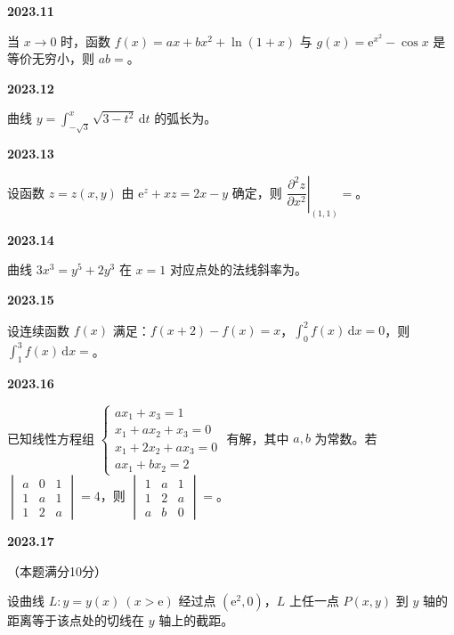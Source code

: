 \documentclass[UTF8,12pt,fontset=windows]{ctexart}
\begin{document}
\vfill
\newpage
{\large\bfseries 2023.11}

当 $x \to 0$ 时，函数 $f(x) = ax + bx^2 + \ln(1+x)$ 与 $g(x) = \mathrm{e}^{x^2} - \cos x$ 是等价无穷小，则 $ab =$\underline{\hspace{20mm}}。

\vfill
\newpage
{\large\bfseries 2023.12}

曲线 $y = \int_{-\sqrt{3}}^{x}\sqrt{3-t^2}\,\mathrm{d}t$ 的弧长为\underline{\hspace{20mm}}。

\vfill
\newpage
{\large\bfseries 2023.13}

设函数 $z = z(x,y)$ 由 $\mathrm{e}^z + xz = 2x - y$ 确定，则 $\left.\dfrac{\partial^2 z}{\partial x^2}\right|_{(1,1)} =$\underline{\hspace{20mm}}。

\vfill
\newpage
{\large\bfseries 2023.14}

曲线 $3x^3 = y^5 + 2y^3$ 在 $x = 1$ 对应点处的法线斜率为\underline{\hspace{20mm}}。

\vfill
\newpage
{\large\bfseries 2023.15}

设连续函数 $f(x)$ 满足：$f(x+2) - f(x) = x$，$\int_{0}^{2}f(x)\,\mathrm{d}x = 0$，则 $\int_{1}^{3}f(x)\,\mathrm{d}x =$\underline{\hspace{20mm}}。

\vfill
\newpage
{\large\bfseries 2023.16}

已知线性方程组 $\begin{cases} ax_1 + x_3 = 1 \\ x_1 + ax_2 + x_3 = 0 \\ x_1 + 2x_2 + ax_3 = 0 \\ ax_1 + bx_2 = 2 \end{cases}$ 有解，其中 $a, b$ 为常数。若 $\begin{vmatrix} a & 0 & 1 \\ 1 & a & 1 \\ 1 & 2 & a \end{vmatrix} = 4$，则 $\begin{vmatrix} 1 & a & 1 \\ 1 & 2 & a \\ a & b & 0 \end{vmatrix} =$\underline{\hspace{20mm}}。

\vfill
\newpage
{\large\bfseries 2023.17}

（本题满分10分）

设曲线 $L: y = y(x)\ (x > \mathrm{e})$ 经过点 $(\mathrm{e}^2, 0)$，$L$ 上任一点 $P(x, y)$ 到 $y$ 轴的距离等于该点处的切线在 $y$ 轴上的截距。
\end{document}
